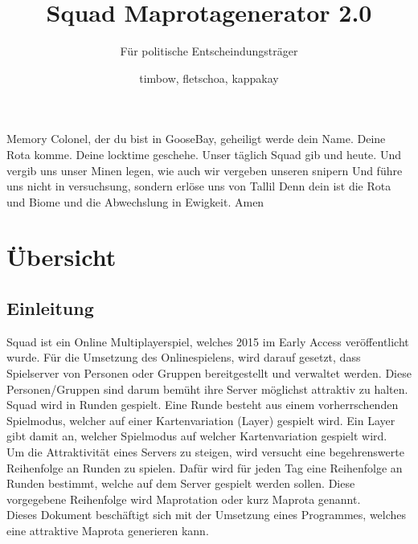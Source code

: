 \documentclass[a4paper, 11pt]{scrreprt}
\title{Squad Maprotagenerator 2.0}
\subtitle{Für politische Entscheindungsträger}
\author{timbow, fletschoa, kappakay}
\begin{document}
    
    \maketitle
    
    \tableofcontents
    \newpage

    Memory Colonel, der du bist in GooseBay, geheiligt werde dein Name.
    Deine Rota komme.
    Deine locktime geschehe.
    Unser täglich Squad gib und heute. Und vergib uns unser Minen legen, wie auch wir vergeben unseren snipern
    Und führe uns nicht in versuchsung, sondern erlöse uns von Tallil
    Denn dein ist die Rota und Biome und die Abwechslung in Ewigkeit.
    Amen

    \newpage
    \listoffigures
    \label{sec:abkuerzungverzeichnis}
    \newpage

    \begin{acronym}[Rota] %
    \end{acronym}


    \chapter{Übersicht}
    \section{Einleitung}
        Squad ist ein Online Multiplayerspiel, welches 2015 im \glqq{}Early Access\grqq{} veröffentlicht wurde.\cite{steampage}
        Für die Umsetzung des Onlinespielens, wird darauf gesetzt, 
        dass Spielserver von Personen oder Gruppen bereitgestellt und verwaltet werden.
        \cite{wiki.serverbrowser}
        Diese Personen/Gruppen sind darum bemüht ihre Server möglichst attraktiv zu halten. \\
        Squad wird in Runden gespielt. Eine Runde besteht aus einem vorherrschenden Spielmodus, 
        welcher auf einer Kartenvariation (Layer) gespielt wird. 
        Ein Layer gibt damit an, welcher Spielmodus auf welcher Kartenvariation gespielt wird.\\ 
        Um die Attraktivität eines Servers zu steigen, wird versucht eine begehrenswerte Reihenfolge an Runden zu spielen.
        Dafür wird für jeden Tag eine Reihenfolge an Runden bestimmt, welche auf dem Server gespielt werden sollen.
        Diese vorgegebene Reihenfolge wird Maprotation oder kurz Maprota genannt.\\
        Dieses Dokument beschäftigt sich mit der Umsetzung eines Programmes, welches eine attraktive Maprota generieren kann.   
\end{document}
